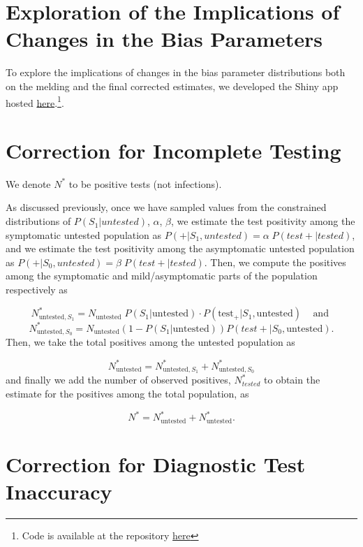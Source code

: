 \documentclass[12pt,twoside]{smiththesis}
\begin{document}
\hypertarget{exploration-of-the-implications-of-changes-in-the-bias-parameters}{%
\section{Exploration of the Implications of Changes in the Bias Parameters}\label{exploration-of-the-implications-of-changes-in-the-bias-parameters}}

To explore the implications of changes in the bias parameter distributions both on the melding and the final corrected estimates, we developed the Shiny app hosted \href{https://q-w-a.shinyapps.io/bayesian_melding_priors/}{here}.\footnote{Code is available at the repository \href{https://github.com/q-w-a/probabilistic_bias_correction}{here}}.

\hypertarget{correction-for-incomplete-testing}{%
\section{Correction for Incomplete Testing}\label{correction-for-incomplete-testing}}

We denote \(N^*\) to be positive tests (not infections).

As discussed previously, once we have sampled values from the constrained distributions of \(P(S_1|untested)\), \(\alpha\), \(\beta\), we estimate the test positivity among the symptomatic untested population as \(P(+|S_1,untested) = \alpha \; P(test +|tested)\), and we estimate the test positivity among the asymptomatic untested population as \(P(+|S_0,untested) = \beta \; P(test +|tested)\). Then, we compute the positives among the symptomatic and mild/asymptomatic parts of the population respectively as

\[N^*_{\text{untested},S_1} = N_{\text{untested}} \; P(S_1|\text{untested}) \cdot P(\text{test}_+ | S_1,\text{untested}) \;\;\;\text{ and }\]
\[N^*_{\text{untested},S_0} = N_{\text{untested}}(1-P(S_1|\text{untested}))P(test + | S_0,\text{untested}).\]
Then, we take the total positives among the untested population as

\[N^*_{\text{untested}} = N^*_{\text{untested},S_1} + N^*_{\text{untested},S_0}\]
and finally we add the number of observed positives, \(N^*_{tested}\) to obtain the estimate for the positives among the total population, as

\[N^* = N^*_{\text{untested}} +N^*_{\text{untested}}.\]

\hypertarget{correct-test-inaccuracy}{%
\section{Correction for Diagnostic Test Inaccuracy}\label{correct-test-inaccuracy}}
\end{document}
